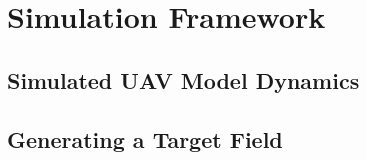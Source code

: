 \chapter{Simulation Framework}


\section{Simulated UAV Model Dynamics}


\section{Generating a Target Field}

